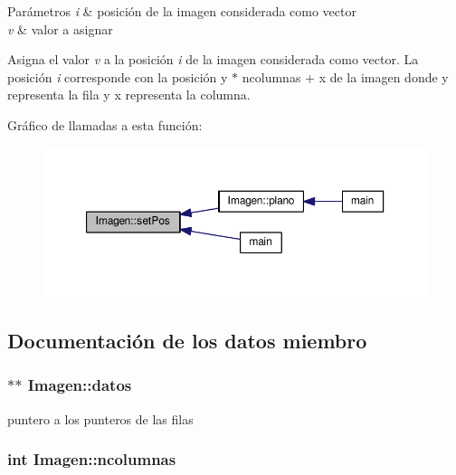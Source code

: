 \begin{DoxyParams}{Parámetros}
{\em i} & posición de la imagen considerada como vector \\
\hline
{\em v} & valor a asignar\\
\hline
\end{DoxyParams}
Asigna el valor {\itshape v} a la posición {\itshape i} de la imagen considerada como vector. La posición {\itshape i} corresponde con la posición {\ttfamily y} $\ast$ {\ttfamily ncolumnas} + {\ttfamily x} de la imagen donde {\ttfamily y} representa la fila y {\ttfamily x} representa la columna. 

Gráfico de llamadas a esta función\+:
\nopagebreak
\begin{figure}[H]
\begin{center}
\leavevmode
\includegraphics[width=350pt]{class_imagen_a9c1bfd9bff6ae8851f3e0c9ac2e90382_icgraph}
\end{center}
\end{figure}




\subsection{Documentación de los datos miembro}
\hypertarget{class_imagen_a74bf3487e42bb65862e994883fa05b33}{}
\subsubsection[{datos}]{$\ast$$\ast$ Imagen\+::datos\hspace{0.3cm}{\ttfamily [private]}}\label{class_imagen_a74bf3487e42bb65862e994883fa05b33}


puntero a los punteros de las filas 

\hypertarget{class_imagen_a4b38c0642ab84fe5f945272180ae8306}{}
\subsubsection[{ncolumnas}]{\setlength{\rightskip}{0pt plus 5cm}int Imagen\+::ncolumnas\hspace{0.3cm}{\ttfamily [private]}}\label{class_imagen_a4b38c0642ab84fe5f945272180ae8306}


